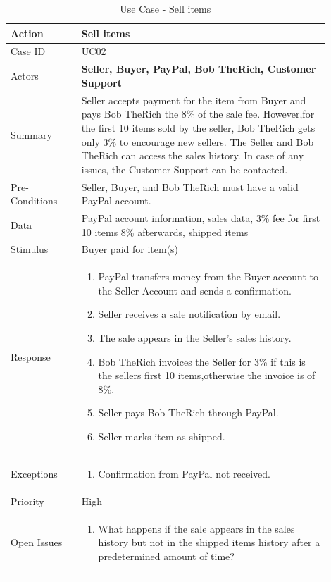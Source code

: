 \documentclass[11pt]{article}
\newcounter{use case ID}
\newcommand\tabularhead[1]{
    \begin{table}[ht]
        \addtocounter{use case ID}{1}
        \caption{Use Case \arabic{use case ID} - #1}
        \vspace{0.2cm}
        \begin{tabular}{|p{0.2\linewidth}|p{0.70\linewidth}|}
            \hline
            \textbf{Action} & \textbf{#1} \\
            \hline}
\newcommand\addrow[2]{#1 & #2\\ \hline}
\newcommand\addmulrow[2]{ \begin{minipage}[t][][t]{2.5cm}#1\end{minipage}
                &\begin{minipage}[t][][t]{11cm}
                    \begin{enumerate}[itemsep=-1ex] #2   \end{enumerate}
                \end{minipage}\vfill\\ \hline}
\newenvironment{usecase}{\tabularhead}
        {\hline\end{tabular}\end{table}}
\begin{document}
\begin{usecase}{Sell items}
    \addrow{Case ID}{UC02}
    \addrow{Actors}{\textbf{Seller, Buyer, PayPal, Bob TheRich, Customer Support}}
    \addrow{Summary}{Seller accepts \index{payment}payment for the item from \index{buyer}Buyer and pays Bob TheRich the 8\% of the sale fee.
    However,for the first 10 items sold by the seller, Bob TheRich gets only 3\% to encourage new sellers. The \index{seller} Seller and Bob TheRich can access the sales history. In case of any issues, the Customer Support can be contacted.}
    \addrow{Pre-Conditions}{Seller, \index{buyer}Buyer, and Bob TheRich must have a valid \index{PayPal}PayPal account. }
    \addrow{\index{data}Data}{PayPal account \index{information}information, sales \index{data}data, 3\% fee for first 10 items 8\% afterwards, shipped items}
    \addrow{Stimulus}{Buyer paid for item(s)}
    \addmulrow{Response}{
            \item \index{PayPal}PayPal transfers money from the \index{buyer}Buyer account to the Seller Account and sends a confirmation.
            \item \index{seller}Seller receives a sale notification by email.
            \item The sale appears in the Seller’s sales history.
            \item Bob TheRich invoices the Seller for 3\% if this is the sellers first 10 items,otherwise the invoice is of 8\%.
            \item Seller pays Bob TheRich through PayPal.
            \item Seller marks item as shipped.
    }

    \addmulrow{Exceptions}{
            \item Confirmation from \index{PayPal}PayPal not received.
    }
    \addrow{Priority}{High}
    \addmulrow{Open Issues}{
            \item What happens if the sale appears in the sales history but not in the shipped items history after a predetermined amount of time?
    }
\end{usecase}
\end{document}
